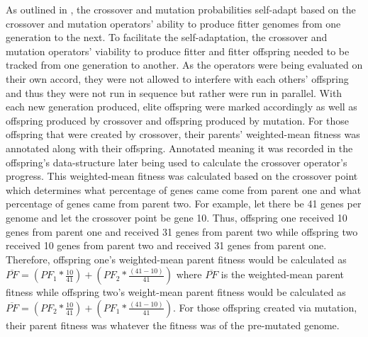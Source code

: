 \documentclass[a4paper,10pt]{article}
\begin{document}
As outlined in \cite{self_adapt}, the crossover and mutation probabilities self-adapt based on the crossover and mutation operators' ability to produce fitter genomes from one generation to the next. To facilitate the self-adaptation, the crossover and mutation operators' viability to produce fitter and fitter offspring needed to be tracked from one generation to another. As the operators were being evaluated on their own accord, they were not allowed to interfere with each others' offspring and thus they were not run in sequence but rather were run in parallel. With each new generation produced, elite offspring were marked accordingly as well as offspring produced by crossover and offspring produced by mutation. For those offspring that were created by crossover, their parents' weighted-mean fitness was annotated along with their offspring. Annotated meaning it was recorded in the offspring's data-structure later being used to calculate the crossover operator's progress. This weighted-mean fitness was calculated based on the crossover point which determines what percentage of genes came come from parent one and what percentage of genes came from parent two. For example, let there be 41 genes per genome and let the crossover point be gene 10. Thus, offspring one received 10 genes from parent one and received 31 genes from parent two while offspring two received 10 genes from parent two and received 31 genes from parent one. Therefore, offspring one's weighted-mean parent fitness would be calculated as $\overline{PF} = \left ( PF_1 * \frac{10}{41} \right ) + \left (PF_2 * \frac{(41-10)}{41} \right)$ where $\overline{PF}$ is the weighted-mean parent fitness while offspring two's weight-mean parent fitness would be calculated as $\overline{PF} = \left ( PF_2 * \frac{10}{41} \right ) + \left (PF_1 * \frac{(41-10)}{41} \right)$. For those offspring created via mutation, their parent fitness was whatever the fitness was of the pre-mutated genome. 
\end{document}
